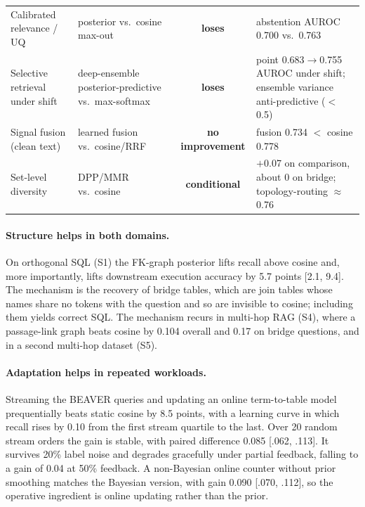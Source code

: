 \documentclass[11pt]{article}
\begin{document}
\begin{table}[t]
\begin{tabular}{@{}p{3.4cm}p{3.2cm}cp{4.6cm}@{}}
Calibrated relevance / UQ & posterior vs.\ cosine max-out & \textbf{loses} & abstention AUROC 0.700 vs.\ 0.763\\
Selective retrieval under shift & deep-ensemble posterior-predictive vs.\ max-softmax & \textbf{loses} & point 0.683$\to$0.755 AUROC under shift; ensemble variance anti-predictive ($<$0.5)\\
Signal fusion (clean text) & learned fusion vs.\ cosine/RRF & \textbf{no improvement} & fusion 0.734 $<$ cosine 0.778\\
Set-level diversity & DPP/MMR vs.\ cosine & \textbf{conditional} & $+$0.07 on comparison, about 0 on bridge; topology-routing $\approx$0.76\\
\bottomrule
\end{tabular}
\end{table}

\paragraph{Structure helps in both domains.} On orthogonal SQL (S1) the FK-graph posterior lifts recall
above cosine and, more importantly, lifts downstream execution accuracy by 5.7 points [2.1, 9.4]. The
mechanism is the recovery of bridge tables, which are join tables whose names share no tokens with the
question and so are invisible to cosine; including them yields correct SQL. The mechanism recurs in
multi-hop RAG (S4), where a passage-link graph beats cosine by 0.104 overall and 0.17 on bridge
questions, and in a second multi-hop dataset (S5).

\paragraph{Adaptation helps in repeated workloads.} Streaming the BEAVER queries and updating an online
term-to-table model prequentially beats static cosine by 8.5 points, with a learning curve in which
recall rises by 0.10 from the first stream quartile to the last. Over 20 random stream orders the gain
is stable, with paired difference 0.085 [.062, .113]. It survives 20\% label noise and degrades
gracefully under partial feedback, falling to a gain of 0.04 at 50\% feedback. A non-Bayesian online
counter without prior smoothing matches the Bayesian version, with gain 0.090 [.070, .112], so the
operative ingredient is online updating rather than the prior.
\end{document}
